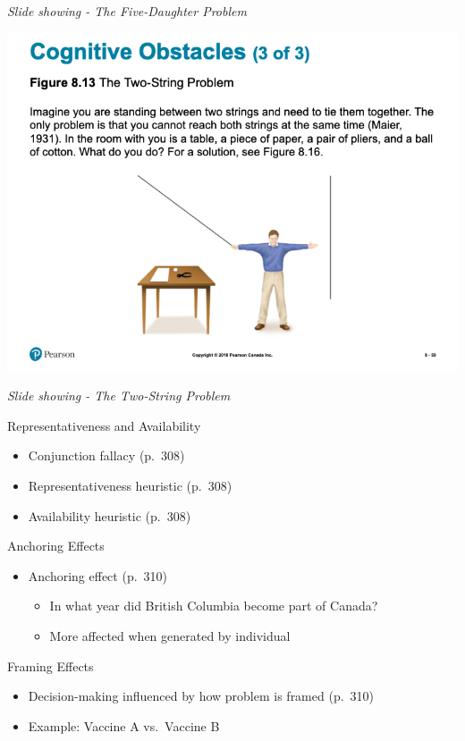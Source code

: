 \documentclass[
]{book}
\providecommand{\tightlist}{%
  \setlength{\itemsep}{0pt}\setlength{\parskip}{0pt}}
\begin{document}
\emph{Slide showing - The Five-Daughter Problem}

\includegraphics{assets/unit_1/slide_59.png}

\emph{Slide showing - The Two-String Problem}

Representativeness and Availability

\begin{itemize}
\tightlist
\item
  Conjunction fallacy (p.~308)\\
\item
  Representativeness heuristic (p.~308)\\
\item
  Availability heuristic (p.~308)
\end{itemize}

Anchoring Effects

\begin{itemize}
\tightlist
\item
  Anchoring effect (p.~310)

  \begin{itemize}
  \tightlist
  \item
    In what year did British Columbia become part of Canada?\\
  \item
    More affected when generated by individual
  \end{itemize}
\end{itemize}

Framing Effects

\begin{itemize}
\tightlist
\item
  Decision-making influenced by how problem is framed (p.~310)\\
\item
  Example: Vaccine A vs.~Vaccine B
\end{itemize}
\end{document}

